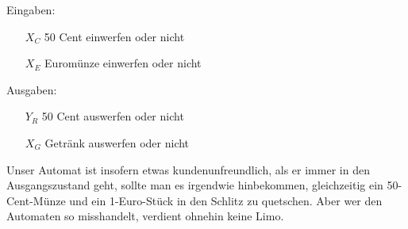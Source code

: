\documentclass{CInf_practice}
\begin{document}
\cinftitle


\noindent Eingaben:
\begin{enumerate}[align=left,leftmargin=\marginparwidth]
   \item[$X_C$] 50 Cent einwerfen oder nicht
   \item[$X_E$] Euromünze einwerfen oder nicht
\end{enumerate}
Ausgaben:
\begin{enumerate}[align=left,leftmargin=\marginparwidth]
   \item[$Y_R$] 50 Cent auswerfen oder nicht
   \item[$X_G$] Getränk auswerfen oder nicht
\end{enumerate}


Unser Automat ist insofern etwas kundenunfreundlich, als er immer in den
Ausgangszustand geht, sollte man es irgendwie hinbekommen, gleichzeitig ein
50-Cent-Münze und ein 1-Euro-Stück in den Schlitz zu quetschen. Aber wer den
Automaten so misshandelt, verdient ohnehin keine Limo.
\end{document}
